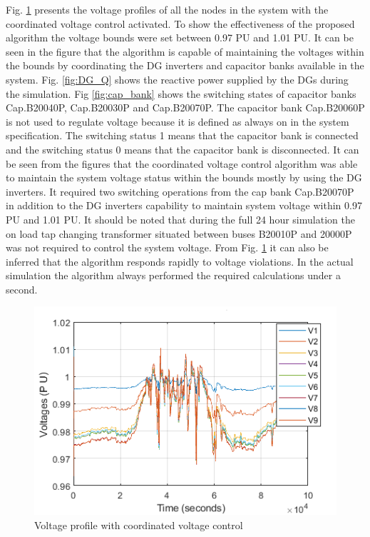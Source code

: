 Fig. \ref{fig:with_cvc} presents the voltage profiles of all the nodes in the system with the coordinated voltage control activated. To show the effectiveness of the proposed algorithm the voltage bounds were set between 0.97 PU and 1.01 PU. It can be seen in the figure that the algorithm is capable of maintaining the voltages within the bounds by coordinating the DG inverters and capacitor banks available in the system. Fig. \ref{fig:DG_Q} shows the reactive power supplied by the DGs during the simulation. Fig \ref{fig:cap_bank} shows the switching states of capacitor banks Cap.B20040P, Cap.B20030P and Cap.B20070P. The capacitor bank Cap.B20060P is not used to regulate voltage because it is defined as always on in the system specification. The switching status 1 means that the capacitor bank is connected and the switching status 0 means that the capacitor bank is disconnected. It can be seen from the figures that the coordinated voltage control algorithm was able to maintain the system voltage status within the bounds mostly by using the DG inverters. It required two switching operations from the cap bank Cap.B20070P in addition to the DG inverters capability to maintain system voltage within 0.97 PU and 1.01 PU. It should be noted that during the full 24 hour simulation the on load tap changing transformer situated between buses B20010P and 20000P was not required to control the system voltage. From Fig. \ref{fig:with_cvc} it can also be inferred that the algorithm responds rapidly to voltage violations. In the actual simulation the algorithm always performed the required calculations under a second.

\begin{figure}[!h]
\centering
\includegraphics[width=\linewidth]{figs/With_VVC.png}
\caption{Voltage profile with coordinated voltage control}
\label{fig:with_cvc}
\end{figure}

